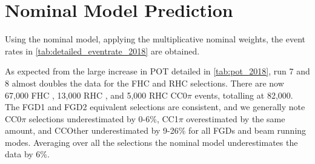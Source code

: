 \clearpage
\section{Nominal Model Prediction}
Using the nominal model, applying the multiplicative nominal weights, the event rates in \autoref{tab:detailed_eventrate_2018} are obtained.

As expected from the large increase in POT detailed in \autoref{tab:pot_2018}, run 7 and 8 almost doubles the data for the FHC and RHC selections. There are now 67,000 FHC \numu, 13,000 RHC \numubar, and 5,000 RHC \numu CC0$\pi$ events, totalling at 82,000. The FGD1 and FGD2 equivalent selections are consistent, and we generally note CC0$\pi$ selections underestimated by 0-6\%, CC1$\pi$ overestimated by the same amount, and CCOther underestimated by 9-26\% for all FGDs and beam running modes. Averaging over all the selections the nominal model underestimates the data by 6\%.

